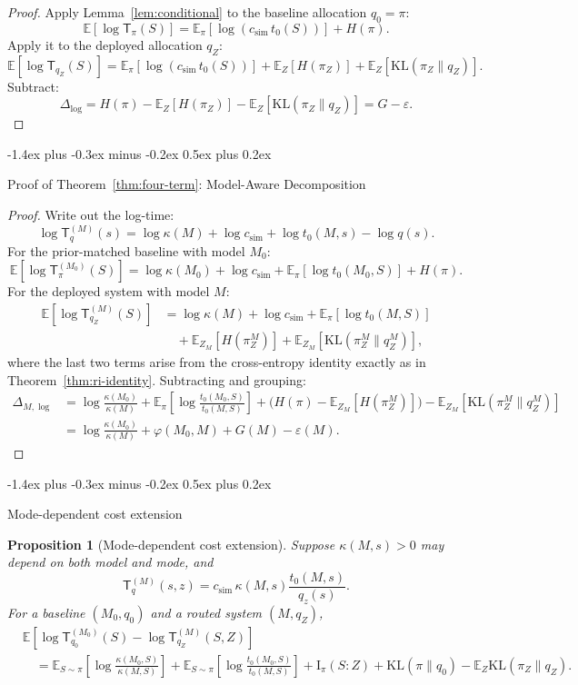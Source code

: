\documentclass[10pt,twocolumn]{article}
\makeatletter
\theoremstyle{paperplain}
\newtheorem{proposition}[theorem]{Proposition}
\theoremstyle{paperdefinition}
\theoremstyle{paperremark}
\renewcommand{\subsection}{%
  \@startsection{subsection}{2}{\z@}%
    {-1.4ex plus -0.3ex minus -0.2ex}%
    {0.5ex plus 0.2ex}%
    {\normalfont\normalsize\bfseries\raggedright}}
\newcommand{\KL}{\mathrm{KL}}
\newcommand{\I}{\mathrm{I}}
\newcommand{\E}{\mathbb{E}}
\newcommand{\Dlog}{\Delta_{\log}}
\newcommand{\DlogM}{\Delta_{M,\log}}
\makeatother
\begin{document}
\begin{proof}
Apply Lemma~\ref{lem:conditional} to the baseline allocation $q_0 = \pi$:
\[
\E\!\left[\log \mathsf{T}_\pi(S)\right]
= \E_\pi[\log(c_{\mathrm{sim}}\, t_0(S))] + H(\pi).
\]
Apply it to the deployed allocation $q_Z$:
\[
\E\!\left[\log \mathsf{T}_{q_Z}(S)\right]
= \E_\pi[\log(c_{\mathrm{sim}}\, t_0(S))] + \E_Z[H(\pi_Z)] + \E_Z[\KL(\pi_Z \| q_Z)].
\]
Subtract:
\[
\Dlog = H(\pi) - \E_Z[H(\pi_Z)] - \E_Z[\KL(\pi_Z \| q_Z)]
= G - \varepsilon.
\]
\end{proof}

\subsection{Proof of Theorem~\ref{thm:four-term}: Model-Aware Decomposition}
\label{app:proof:thm:four-term}

\begin{proof}
Write out the log-time:
\[
\log \mathsf{T}_q^{(M)}(s) = \log \kappa(M) + \log c_{\mathrm{sim}} + \log t_0(M,s) - \log q(s).
\]
For the prior-matched baseline with model $M_0$:
\[
\E\!\left[\log \mathsf{T}_\pi^{(M_0)}(S)\right]
= \log\kappa(M_0) + \log c_{\mathrm{sim}} + \E_\pi[\log t_0(M_0,S)] + H(\pi).
\]
For the deployed system with model $M$:
\begin{align*}
\E\!\left[\log \mathsf{T}_{q_Z}^{(M)}(S)\right]
&= \log\kappa(M) + \log c_{\mathrm{sim}} + \E_\pi[\log t_0(M,S)] \\
&\quad + \E_{Z_M}[H(\pi_Z^M)] + \E_{Z_M}[\KL(\pi_Z^M \| q_Z^M)],
\end{align*}
where the last two terms arise from the cross-entropy identity exactly as in Theorem~\ref{thm:ri-identity}.
Subtracting and grouping:
\begin{align*}
\DlogM &= \log\frac{\kappa(M_0)}{\kappa(M)}
+ \E_\pi\!\left[\log\frac{t_0(M_0,S)}{t_0(M,S)}\right]
+ \bigl(H(\pi) - \E_{Z_M}[H(\pi_Z^M)]\bigr)
- \E_{Z_M}[\KL(\pi_Z^M \| q_Z^M)] \\[4pt]
&= \log\frac{\kappa(M_0)}{\kappa(M)} + \varphi(M_0,M) + G(M) - \varepsilon(M).
\end{align*}
\end{proof}

\subsection{Mode-dependent cost extension}

\begin{proposition}[Mode-dependent cost extension]
\label{prop:mode-dependent-cost}
Suppose $\kappa(M,s)>0$ may depend on both model and mode, and
\[
\mathsf{T}_q^{(M)}(s,z)
=c_{\mathrm{sim}}\,\kappa(M,s)\frac{t_0(M,s)}{q_z(s)}.
\]
For a baseline $(M_0,q_0)$ and a routed system $(M,q_Z)$,
\[
\begin{aligned}
&\E\!\left[\log\mathsf{T}_{q_0}^{(M_0)}(S)-\log\mathsf{T}_{q_Z}^{(M)}(S,Z)\right]\\
&\quad=
\E_{S\sim\pi}\!\left[\log\frac{\kappa(M_0,S)}{\kappa(M,S)}\right]
+\E_{S\sim\pi}\!\left[\log\frac{t_0(M_0,S)}{t_0(M,S)}\right]
+\I_\pi(S:Z)+\KL(\pi\|q_0)-\E_Z\KL(\pi_Z\|q_Z).
\end{aligned}
\]
\end{proposition}
\end{document}
